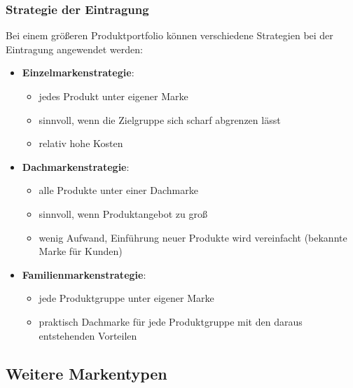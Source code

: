 \documentclass[12pt,A4]{extarticle}
\newcommand{\highlight}[1]{\textcolor{highlightColor}{\textbf{#1}}}
\begin{document}
\subsubsection{Strategie der Eintragung}
Bei einem größeren Produktportfolio können verschiedene Strategien bei der Eintragung angewendet werden:
\begin{itemize}
  \item{\highlight{Einzelmarkenstrategie}:
              \begin{itemize}
                \item{jedes Produkt unter eigener Marke}
                \item{sinnvoll, wenn die Zielgruppe sich scharf abgrenzen lässt}
                \item{relativ hohe Kosten}
              \end{itemize}
        }
  \item{\highlight{Dachmarkenstrategie}:
              \begin{itemize}
                \item{alle Produkte unter einer Dachmarke}
                \item{sinnvoll, wenn Produktangebot zu groß}
                \item{wenig Aufwand, Einführung neuer Produkte wird vereinfacht (bekannte Marke für Kunden)}
              \end{itemize}
        }
  \item{\highlight{Familienmarkenstrategie}:
              \begin{itemize}
                \item{jede Produktgruppe unter eigener Marke}
                \item{praktisch Dachmarke für jede Produktgruppe mit den daraus entstehenden Vorteilen}
              \end{itemize}
        }
\end{itemize}

\subsection{Weitere Markentypen}
\end{document}
